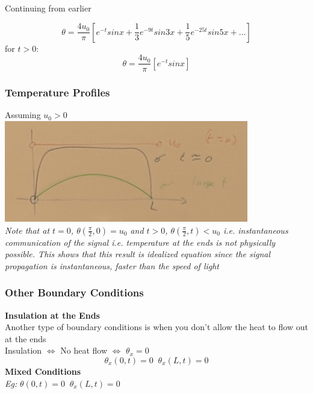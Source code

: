 \documentclass[11pt]{article}
\theoremstyle{definition}
\begin{document}
Continuing from earlier

$$\theta = \frac{4u_0}{\pi}[e^{-t}sinx + \frac{1}{3}e^{-9t}sin3x + \frac{1}{5}e^{-25t}sin5x + \dots]$$
for $t > 0$:
$$\theta = \frac{4u_0}{\pi}[e^{-t}sinx]$$
\subsubsection{Temperature Profiles}
Assuming $u_0 > 0$\\
\includegraphics[]{MVIMG_20181127_084026.jpg}\\
\textit{Note that at $t=0$, $\theta(\frac{\pi}{2},0) = u_0$ and $t>0$, $\theta(\frac{\pi}{2},t) < u_0$ i.e. instantaneous communication of the signal i.e. temperature at the ends is not physically possible. This shows that this result is idealized equation since the signal propagation is instantaneous, faster than the speed of light}\\
\subsubsection{Other Boundary Conditions}
\textbf{Insulation at the Ends}\\
Another type of boundary conditions is when you don't allow the heat to flow out at the ends
\\
Insulation $\Longleftrightarrow$ No heat flow $\Longleftrightarrow$ $\theta_x = 0$
$$\theta_x(0,t) = 0\; \; \theta_x(L,t) = 0$$
\textbf{Mixed Conditions}\\
\textit{Eg:} $\theta(0,t) = 0\;\; \theta_x(L,t) = 0$
\end{document}
